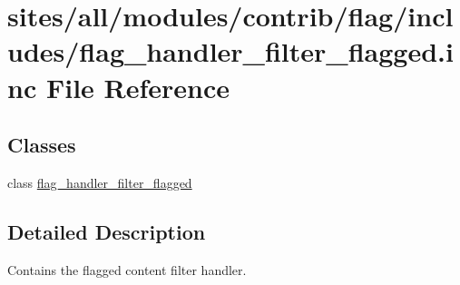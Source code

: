 \hypertarget{flag__handler__filter__flagged_8inc}{
\section{sites/all/modules/contrib/flag/includes/flag\_\-handler\_\-filter\_\-flagged.inc File Reference}
\label{flag__handler__filter__flagged_8inc}
}
\subsection*{Classes}
\begin{CompactItemize}
\item 
class \hyperlink{classflag__handler__filter__flagged}{flag\_\-handler\_\-filter\_\-flagged}
\end{CompactItemize}


\subsection{Detailed Description}
Contains the flagged content filter handler. 